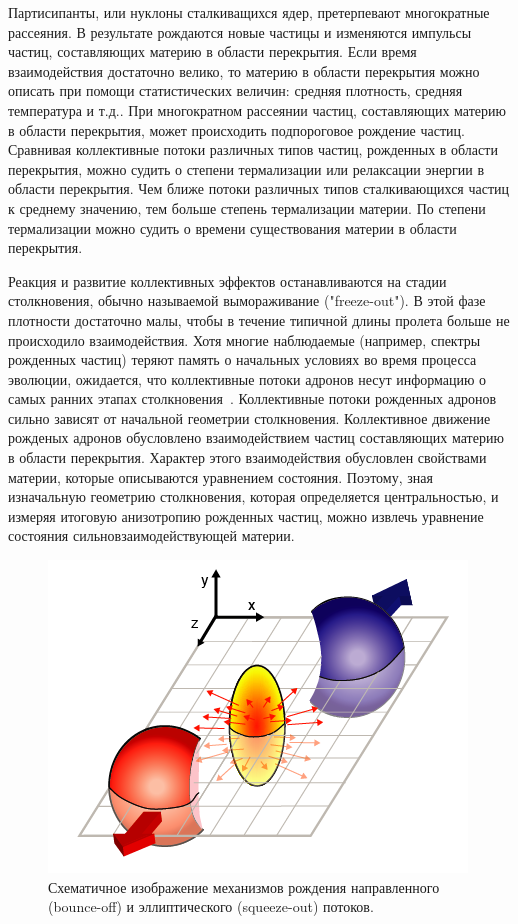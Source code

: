 Партисипанты, или нуклоны сталкиващихся ядер, претерпевают многократные рассеяния.
В результате рождаются новые частицы и изменяются импульсы частиц, составляющих материю в области перекрытия.
Если время взаимодействия достаточно велико, то материю в области перекрытия можно описать при помощи статистических величин: средняя плотность, средняя температура и т.д..
При многократном рассеянии частиц, составляющих материю в области перекрытия, может происходить подпороговое рождение частиц.
Сравнивая коллективные потоки различных типов частиц, рожденных в области перекрытия, можно судить о степени термализации или релаксации энергии в области перекрытия.
Чем ближе потоки различных типов сталкивающихся частиц к среднему значению, тем больше степень термализации материи.
По степени термализации можно судить о времени существования материи в области перекрытия.  

Реакция и развитие коллективных эффектов останавливаются на стадии столкновения, обычно называемой вымораживание ("freeze-out"). 
В этой фазе плотности достаточно малы, чтобы в течение типичной длины пролета больше не происходило взаимодействия.
Хотя многие наблюдаемые (например, спектры рожденных частиц) теряют память о начальных условиях во время процесса эволюции, ожидается, что коллективные потоки адронов несут информацию о самых ранних этапах столкновения~\cite{Herrmann:1999wu}.
Коллективные потоки рожденных адронов сильно зависят от начальной геометрии столкновения.
Коллективное движение рожденых адронов обусловлено взаимодействием частиц составляющих материю в области перекрытия.
Характер этого взаимодействия обусловлен свойствами материи, которые описываются уравнением состояния.
Поэтому, зная изначальную геометрию столкновения, которая определяется центральностью, и измеряя итоговую анизотропию рожденных частиц, можно извлечь уравнение состояния сильновзаимодействующей материи.

%
\begin{figure}[ht]
\begin{center}
    \includegraphics[width=0.75\linewidth]{images/illustration_1_initial_spatial_asymmetry.png}
    \caption{Схематичное изображение механизмов рождения направленного (bounce-off) и эллиптического (squeeze-out) потоков.}
    \label{fig:bounce_off}
\end{center}
\end{figure}
%

